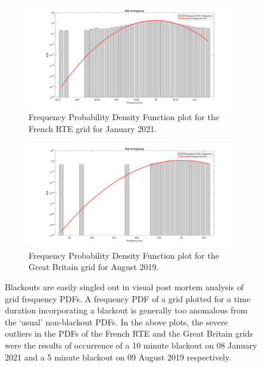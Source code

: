\begin{figure}[!ht]
	\centering
	\begin{subfigure}{\textwidth}
		\centering
		\includegraphics[scale=0.25]{../figures/pdf/pdf_frequency_rte_2021_01_blackout}
		\caption{Frequency Probability Density Function plot for the French RTE grid for January 2021.}
	\end{subfigure}
	
	\begin{subfigure}{\textwidth}
		\centering
		\includegraphics[scale=0.25]{../figures/pdf/pdf_frequency_uk_2019_08_blackout}
		\caption{Frequency Probability Density Function plot for the Great Britain grid for August 2019.}
	\end{subfigure}
	\caption{Blackouts are easily singled out in visual post mortem analysis of grid frequency PDFs. A frequency PDF of a grid plotted for a time duration incorporating a blackout is generally too anomalous from the `usual' non-blackout PDFs. In the above plots, the severe outliers in the PDFs of the French RTE and the Great Britain grids were the results of occurrence of a 10 minute blackout on 08 January 2021 and a 5 minute blackout on 09 August 2019 respectively.}
\end{figure}

